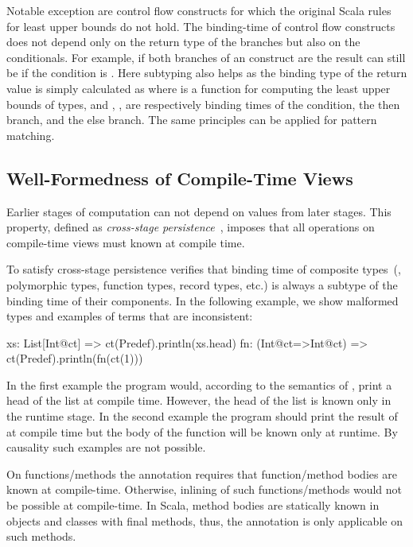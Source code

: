 Notable exception are control flow constructs for which the original Scala rules for least
 upper bounds do not hold. The binding-time of control flow constructs does not
 depend only on the return type of the branches but also on the conditionals. For example, if
 both branches of an  construct are  the result can still be 
 if the condition is . Here subtyping also helps as the binding type of the
 return value is simply calculated as  where  is a function
 for computing the least upper bounds of types, and , ,  are respectively
 binding times of the condition, the then branch, and the else branch. The same principles can be applied for
 pattern matching.

\subsection{Well-Formedness of Compile-Time Views}
\label{sct:wf-ctv}

Earlier stages of computation can not depend on values from later stages. This property,
 defined as \emph{cross-stage persistence}~\cite{taha_multi-stage_1997,westbrook2010mint},
 imposes that all operations on compile-time views must known at compile time.

To satisfy cross-stage persistence \tool verifies that binding time of composite
 types~(\eg, polymorphic types, function types, record types, etc.) is always
 a subtype of the binding time of their components. In the following example,
 we show malformed types and examples of terms that are inconsistent:\begin{lstparagraph}
xs: List[Int@ct]     => ct(Predef).println(xs.head)
fn: (Int@ct=>Int@ct) => ct(Predef).println(fn(ct(1)))
\end{lstparagraph}

In the first example the program would, according to the semantics of , print a head of the list at compile time.
 However, the head of the list is known only in the runtime stage. In the second example the program should
 print the result of  at compile time but the body of the function will
 be known only at runtime. By causality such examples are not possible.

On functions/methods the  annotation requires that function/method bodies are known at compile-time.
 Otherwise, inlining of such functions/methods would not be possible at compile-time. In Scala,
 method bodies are statically known in objects and classes with final methods, thus, the 
 annotation is only applicable on such methods.

